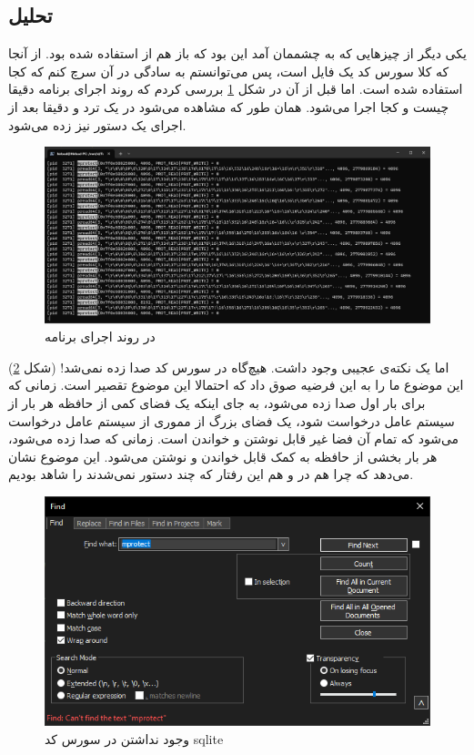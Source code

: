 \subsection{تحلیل}
یکی دیگر از چیز‌هایی که به چشممان آمد این بود که باز هم از
استفاده شده بود. از آنجا که کلا سورس کد
یک فایل است، پس می‌توانستم به سادگی در آن سرچ کنم که کجا
استفاده شده است. اما قبل از آن در شکل
\ref{fig:sqlite3:results:mprotect}
بررسی کردم که روند اجرای برنامه دقیقا چیست و کجا
اجرا می‌شود. همان طور که مشاهده می‌شود در یک ترد و دقیقا بعد از اجرای
 یک دستور 
نیز زده می‌شود.
\begin{figure}[H]
    \centering
    \includegraphics[scale=0.4]{pictures/sqlite3/results/mprotect.png}
    \caption{ در روند اجرای برنامه}
    \label{fig:sqlite3:results:mprotect}
\end{figure}
اما یک نکته‌ی عجیبی وجود داشت. هیچ‌گاه
در سورس کد
صدا زده نمی‌شد!
(شکل \ref{fig:sqlite3:results:mprotect2})
این موضوع ما را به این فرضیه صوق داد که احتمالا این موضوع تقصیر
است. زمانی که برای بار اول
صدا زده می‌شود، به جای اینکه یک فضای کمی از حافظه هر بار از سیستم عامل درخواست شود، یک فضای بزرگ
از مموری از سیستم عامل درخواست می‌شود که تمام آن فضا غیر قابل نوشتن و خواندن است.
زمانی که
صدا زده می‌شود، هر بار بخشی از حافظه به کمک
قابل خواندن و نوشتن می‌شود. این موضوع نشان می‌دهد که چرا هم در
 و هم 
این رفتار که چند دستور
 
نمی‌شدند را شاهد بودیم.
\begin{figure}[H]
    \centering
    \includegraphics[scale=0.6]{pictures/sqlite3/results/mprotect2.png}
    \caption{وجود نداشتن  در سورس کد sqlite}
    \label{fig:sqlite3:results:mprotect2}
\end{figure}